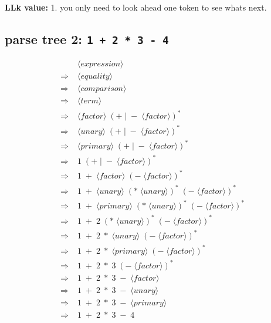 \documentclass[12pt]{article}
\begin{document}
\textbf{LLk value:} 1. you only need to look ahead one token to see whats next.

\subsection*{parse tree 2: \texttt{1 + 2 * 3 - 4}}

\begin{align*}
&\langle\textit{expression}\rangle \\
\Rightarrow\;&\langle\textit{equality}\rangle \\
\Rightarrow\;&\langle\textit{comparison}\rangle \\
\Rightarrow\;&\langle\textit{term}\rangle \\
\Rightarrow\;&\langle\textit{factor}\rangle\;(+\;|\;-\;\langle\textit{factor}\rangle)^* \\
\Rightarrow\;&\langle\textit{unary}\rangle\;(+\;|\;-\;\langle\textit{factor}\rangle)^* \\
\Rightarrow\;&\langle\textit{primary}\rangle\;(+\;|\;-\;\langle\textit{factor}\rangle)^* \\
\Rightarrow\;&1\;(+\;|\;-\;\langle\textit{factor}\rangle)^* \\
\Rightarrow\;&1\;+\;\langle\textit{factor}\rangle\;(-\;\langle\textit{factor}\rangle)^* \\
\Rightarrow\;&1\;+\;\langle\textit{unary}\rangle\;(*\;\langle\textit{unary}\rangle)^*\;(-\;\langle\textit{factor}\rangle)^* \\
\Rightarrow\;&1\;+\;\langle\textit{primary}\rangle\;(*\;\langle\textit{unary}\rangle)^*\;(-\;\langle\textit{factor}\rangle)^* \\
\Rightarrow\;&1\;+\;2\;(*\;\langle\textit{unary}\rangle)^*\;(-\;\langle\textit{factor}\rangle)^* \\
\Rightarrow\;&1\;+\;2\;*\;\langle\textit{unary}\rangle\;(-\;\langle\textit{factor}\rangle)^* \\
\Rightarrow\;&1\;+\;2\;*\;\langle\textit{primary}\rangle\;(-\;\langle\textit{factor}\rangle)^* \\
\Rightarrow\;&1\;+\;2\;*\;3\;(-\;\langle\textit{factor}\rangle)^* \\
\Rightarrow\;&1\;+\;2\;*\;3\;-\;\langle\textit{factor}\rangle \\
\Rightarrow\;&1\;+\;2\;*\;3\;-\;\langle\textit{unary}\rangle \\
\Rightarrow\;&1\;+\;2\;*\;3\;-\;\langle\textit{primary}\rangle \\
\Rightarrow\;&1\;+\;2\;*\;3\;-\;4
\end{align*}
\end{document}
